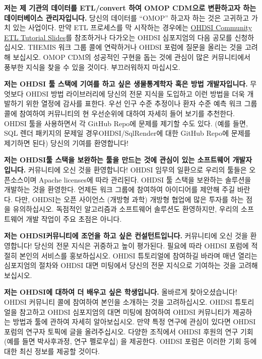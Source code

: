 \documentclass[11pt]{book}
\theoremstyle{definition}
\theoremstyle{definition}
\theoremstyle{definition}
\theoremstyle{remark}
\begin{document}
\textbf{저는 제 기관의 데이터를 ETL/convert 하여 OMOP CDM으로 변환하고자
하는 데이터베이스 관리자입니다.} 당신의 데이터를 ``OMOP'' 하고자 하는
것은 고귀하고 가치 있는 사업이다. 만약 ETL 프로세스를 막 시작하는
경우에는
\href{https://www.ohdsi-europe.org/images/symposium-2019/tutorials/OHDSI_Vocabulary_CDM_Tutorial.pdf}{OHDSI
Community ETL Tutorial Slides}를 참조하거나 다가오는 OHDSI 심포지엄의
다음 공모를 신청하십시오. THEMIS 워크 그룹 콜에 연락하거나 OHDSI 포럼에
질문을 올리는 것을 고려해 보십시오. OMOP CDM의 성공적인 구현을 돕는 것에
관심이 많은 커뮤니티에서 풍부한 지식을 찾을 수 있을 것이다. 부끄러워하지
마십시오.

\textbf{저는 OHDSI 툴 스택에 기여를 하고 싶은 생물통계학자 혹은 방법
개발자입니다.} 무엇보다 OHDSI 방법 라이브러리에 당신의 전문 지식을
도입하고 이런 방법을 더욱 개발하기 위한 열정에 감사를 표한다. 우선 인구
수준 추정이나 환자 수준 예측 워크 그룹 콜에 참여하여 커뮤니티의 현
우선순위에 대하여 자세히 들어 보기를 추천한다. OHDSI 툴을 사용하면서 각
GitHub Repo에 문제를 제기할 수도 있다. (예를 들면, SQL 렌더 패키지의
문제일 경우OHDSI/SqlRender에 대한 GitHub Repo에 문제를 제기하면 된다)
당신의 기여를 환영합니다!

\textbf{저는 OHDSI툴 스택을 보완하는 툴을 만드는 것에 관심이 있는
소프트웨어 개발자입니다.} 커뮤니티에 오신 것을 환영합니다! OHDSI 임무의
일환으로 우리의 툴들은 오픈소스이며 Apache licenses에 따라 관리된다.
OHDSI 툴 스택을 보완하는 솔루션을 개발하는 것을 환영한다. 언제든 워크
그룹에 참여하여 아이디어를 제안해 주길 바란다. 다만, OHDSI는 오픈
사이언스 (개방형 과학) 개방형 협업에 많은 투자를 하는 점을 유의하십시오.
독점적인 알고리즘과 소프트웨어 솔루션도 환영하지만, 우리의 소프트웨어
개발 작업이 주요 초점은 아니다.

\textbf{저는 OHDSI커뮤니티에 조언을 하고 싶은 컨설턴트입니다.}
커뮤니티에 오신 것을 환영합니다! 당신의 전문 지식은 귀중하고 높이
평가된다. 필요에 따라 OHDSI 포럼에 적절히 본인의 서비스를 홍보하십시오.
OHDSI 튜토리얼에 참여하길 바라며 매년 열리는 심포지엄의 절차와 OHDSI
대면 미팅에서 당신의 전문 지식으로 기여하는 것을 고려해 보십시오.

\textbf{저는 OHDSI에 대하여 더 배우고 싶은 학생입니다.} 올바르게
찾아오셨습니다! OHDSI 커뮤니티 콜에 참여하여 본인을 소개하는 것을
고려하십시오. OHDSI 튜토리얼을 참고하고 OHDSI 심포지엄의 대면 미팅에
참여하여 OHDSI 커뮤니티가 제공하는 방법과 툴에 관하여 자세히
알아보십시오. 만약 특정 연구에 관심이 있다면 OHDSI 포럼의 연구자 토픽에
글을 올려주십시오. 다양한 조직에서 OHDSI 후원의 연구 기회 (예를 들면
박사후과정, 연구 펠로우십) 을 제공한다. OHDSI 포럼은 이러한 기회 등에
대한 최신 정보를 제공할 것이다.
\end{document}
